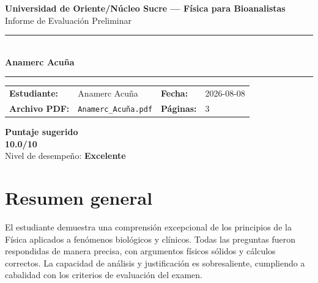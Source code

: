 \documentclass[11pt,a4paper]{article}
\begin{document}
\begin{center}
  {\Large\bfseries\color{azulTitulo} Universidad de Oriente/Núcleo Sucre --- Física para Bioanalistas}\\[4pt]
  {\large Informe de Evaluación Preliminar}\\[12pt]
  \rule{\linewidth}{1.2pt}\\[6pt]
  {\LARGE\bfseries Anamerc Acuña}\\[4pt]
  \rule{\linewidth}{0.6pt}
\end{center}

\vspace{4pt}
\begin{tcolorbox}[cajaTitulo, title=Datos del informe]
\begin{tabular}{@{}llll@{}}
  \textbf{Estudiante:}  & Anamerc Acuña  &
  \textbf{Fecha:}       & 2026-08-08 \\[4pt]
  \textbf{Archivo PDF:} & \texttt{Anamerc\_Acuña.pdf}  &
  \textbf{Páginas:}     & 3 \\
\end{tabular}
\end{tcolorbox}

\vspace{6pt}
\begin{center}
  \begin{tcolorbox}[
    enhanced,
    colback=white, colframe=desempeno_excelente,
    width=0.62\linewidth,
    boxrule=2pt,
    halign=center, valign=center,
    top=8pt, bottom=8pt,
  ]
    \centering
    {\large\bfseries Puntaje sugerido}\\[6pt]
    {\Huge\bfseries\color{desempeno_excelente} 10.0/10}\\[6pt]
    {\large Nivel de desempeño: \textbf{\color{desempeno_excelente} Excelente}}
  \end{tcolorbox}
\end{center}

\section*{Resumen general}
El estudiante demuestra una comprensión excepcional de los principios de la Física aplicados a fenómenos biológicos y clínicos. Todas las preguntas fueron respondidas de manera precisa, con argumentos físicos sólidos y cálculos correctos. La capacidad de análisis y justificación es sobresaliente, cumpliendo a cabalidad con los criterios de evaluación del examen.
\end{document}
